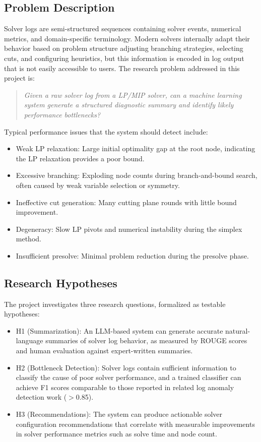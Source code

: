 \documentclass[11pt]{article}
\begin{document}
\subsection{Problem Description}

Solver logs are semi-structured sequences containing solver events, numerical metrics, and domain-specific terminology. Modern solvers internally adapt their behavior based on problem structure 
adjusting branching strategies, selecting cuts, and configuring heuristics, but this information is encoded in log output that is not easily accessible to users. 
The research problem addressed in this project is:

\begin{quote}
\emph{Given a raw solver log from a LP/MIP solver, can a machine learning system generate a structured diagnostic summary and identify likely performance bottlenecks?}
\end{quote}

Typical performance issues that the system should detect include:

\begin{itemize}
    \item Weak LP relaxation: Large initial optimality gap at the root node, indicating the LP relaxation provides a poor bound.
    \item Excessive branching: Exploding node counts during branch-and-bound search, often caused by weak variable selection or symmetry.
    \item Ineffective cut generation: Many cutting plane rounds with little bound improvement.
    \item Degeneracy: Slow LP pivots and numerical instability during the simplex method.
    \item Insufficient presolve: Minimal problem reduction during the presolve phase.
\end{itemize}

\subsection{Research Hypotheses}

The project investigates three research questions, formalized as testable hypotheses:

\begin{itemize}
    \item H1 (Summarization): An LLM-based system can generate accurate natural-language summaries of solver log behavior, as measured by ROUGE scores and human evaluation against
    expert-written summaries.
    \item H2 (Bottleneck Detection): Solver logs contain sufficient information to classify the cause of poor solver performance, and a trained classifier can achieve F1 scores 
    comparable to those reported in related log anomaly detection work ($>$0.85).
    \item H3 (Recommendations): The system can produce actionable solver configuration recommendations that correlate with measurable improvements in solver performance metrics 
    such as solve time and node count.
\end{itemize}
\end{document}
